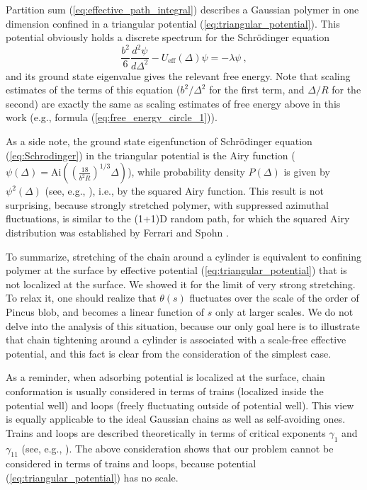 \documentclass[aps,pre,floatfix,twocolumn,nofootinbib]{revtex4-2}
\begin{document}
%
Partition sum (\ref{eq:effective_path_integral}) describes a Gaussian polymer in one dimension confined in a triangular potential (\ref{eq:triangular_potential}).  This potential obviously holds a discrete spectrum for the Schr\"{o}dinger equation
%
\begin{equation} \frac{b^2}{6} \frac{d^2 \psi}{d \Delta^2} - U_{\mathrm{eff}} (\Delta) \psi = -\lambda \psi \ , \label{eq:Schrodinger} \end{equation}
%
and its ground state eigenvalue gives the relevant free energy.  Note that scaling estimates of the terms of this equation ($b^2/\Delta^2$ for the first term, and $\Delta / R$ for the second) are exactly the same as scaling estimates of free energy above in this work (e.g., formula (\ref{eq:free_energy_circle_1})).

As a side note, the ground state eigenfunction of Schr\"{o}dinger equation (\ref{eq:Schrodinger}) in the triangular potential is the Airy function ($\psi(\Delta) = \mathrm{Ai} \left( \left( \frac{18}{b^2 R} \right)^{1/3} \Delta \right)$), while probability density $P(\Delta)$ is given by $\psi^2(\Delta)$ (see, e.g., \cite{RedBook}), i.e., by the squared Airy function.  This result is not surprising, because strongly stretched polymer, with suppressed azimuthal fluctuations, is similar to the (1+1)D random path, for which the squared Airy distribution was established by Ferrari and Spohn \cite{spohn_ferrari}.

To summarize, stretching of the chain around a cylinder is equivalent to confining polymer at the surface by effective potential (\ref{eq:triangular_potential}) that is not localized at the surface.   We showed it for the limit of very strong stretching.  To relax it, one should realize that $\theta(s)$ fluctuates over the scale of the order of Pincus blob, and becomes a linear function of $s$ only at larger scales.  We do not delve into the analysis of this situation, because our only goal here is to illustrate that chain tightening around a cylinder is associated with a scale-free effective potential, and this fact is clear from the consideration of the simplest case.

As a reminder, when adsorbing potential is localized at the surface, chain conformation is usually considered in terms of trains (localized inside the potential well) and loops (freely fluctuating outside of potential well).  This view is equally applicable to the ideal Gaussian chains as well as self-avoiding ones.  Trains and loops are described theoretically in terms of critical exponents $\gamma_{1}$ and $\gamma_{11}$ (see, e.g., \cite{Paper_about_gamma}).  The above consideration shows that our problem cannot be considered in terms of trains and loops, because potential (\ref{eq:triangular_potential}) has no scale.
\end{document}
